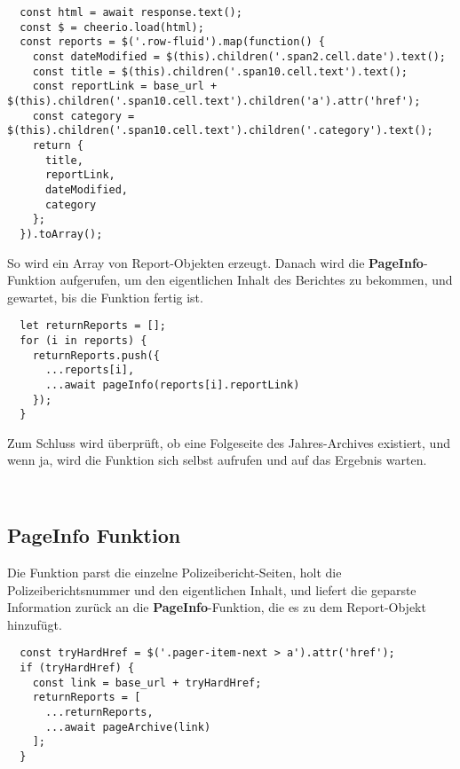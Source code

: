 \begin{verbatim}
  const html = await response.text();
  const $ = cheerio.load(html);
  const reports = $('.row-fluid').map(function() {
    const dateModified = $(this).children('.span2.cell.date').text();
    const title = $(this).children('.span10.cell.text').text();
    const reportLink = base_url + $(this).children('.span10.cell.text').children('a').attr('href');
    const category = $(this).children('.span10.cell.text').children('.category').text();
    return {
      title,
      reportLink,
      dateModified,
      category
    };
  }).toArray();
  \end{verbatim}

So wird ein Array von Report-Objekten erzeugt. Danach wird die
\textbf{PageInfo}-Funktion aufgerufen, um den eigentlichen Inhalt des Berichtes zu bekommen,
und gewartet, bis die Funktion fertig ist.

\begin{verbatim}
  let returnReports = [];
  for (i in reports) {
    returnReports.push({
      ...reports[i],
      ...await pageInfo(reports[i].reportLink)
    });
  }	
  \end{verbatim}

Zum Schluss wird überprüft, ob eine Folgeseite des Jahres-Archives existiert, und wenn ja, wird die
Funktion sich selbst aufrufen und auf das Ergebnis warten.

\begin{verbatim}
  
  \end{verbatim}

\subsection{PageInfo Funktion}\label{header-n94}

Die Funktion parst die einzelne Polizeibericht-Seiten, holt die Polizeiberichtsnummer und den eigentlichen
Inhalt, und liefert die geparste Information zurück an die \textbf{PageInfo}-Funktion,
die es zu dem Report-Objekt hinzufügt.

\begin{verbatim}
  const tryHardHref = $('.pager-item-next > a').attr('href');
  if (tryHardHref) {
    const link = base_url + tryHardHref;    
    returnReports = [
      ...returnReports,
      ...await pageArchive(link)
    ];
  }
  \end{verbatim}

